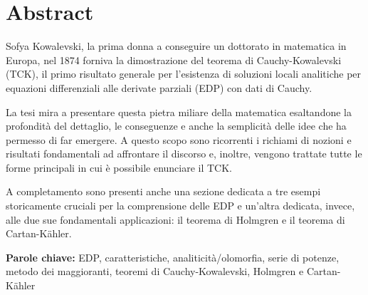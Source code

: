 \chapter*{Abstract}

Sofya Kowalevski, la prima donna a conseguire un dottorato in matematica in Europa, nel 1874 forniva la dimostrazione del teorema di Cauchy-Kowalevski (TCK), il primo risultato generale per l'esistenza di soluzioni locali analitiche per equazioni differenziali alle derivate parziali (EDP) con dati di Cauchy.

\vspace{6mm}
La tesi mira a presentare questa pietra miliare della matematica esaltandone la profondità del dettaglio, le conseguenze e anche la semplicità delle idee che ha permesso di far emergere. A questo scopo sono ricorrenti i richiami di nozioni e risultati fondamentali ad affrontare il discorso e, inoltre, vengono trattate tutte le forme principali in cui è possibile enunciare il TCK.

\vspace{6mm}
A completamento sono presenti anche una sezione dedicata a tre esempi storicamente cruciali per la comprensione delle EDP e un'altra dedicata, invece, alle due sue fondamentali applicazioni: il teorema di Holmgren e il teorema di Cartan-Kähler.

\vspace{6mm}
\textbf{Parole chiave:} EDP, caratteristiche, analiticità/olomorfia, serie di potenze, metodo dei maggioranti, teoremi di Cauchy-Kowalevski, Holmgren e Cartan-Kähler

\newpage
\blankpage